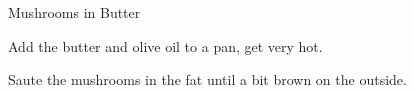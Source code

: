 \documentclass{recipe}
\begin{document}
\begin{recipe}{Mushrooms in Butter}
  \label{comp-mushrooms_butter}
  \begin{ingredients}
  \end{ingredients}

  \begin{steps}
    \item Add the butter and olive oil to a pan, get very hot.
    \item Saute the mushrooms in the fat until a bit brown on the
      outside.
  \end{steps}
\end{recipe}
\end{document}
